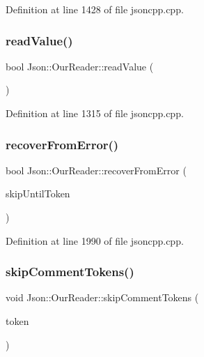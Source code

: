 Definition at line 1428 of file jsoncpp.\+cpp.

\hypertarget{class_json_1_1_our_reader_a1765d9670d191c89a57a22ea5591d35f}{}\label{class_json_1_1_our_reader_a1765d9670d191c89a57a22ea5591d35f} 
\subsubsection{\texorpdfstring{read\+Value()}{readValue()}}
{\footnotesize\ttfamily bool Json\+::\+Our\+Reader\+::read\+Value (\begin{DoxyParamCaption}{ }\end{DoxyParamCaption})\hspace{0.3cm}{\ttfamily [private]}}



Definition at line 1315 of file jsoncpp.\+cpp.

\hypertarget{class_json_1_1_our_reader_a035651f0700a76a815e5f904c63ebb1c}{}\label{class_json_1_1_our_reader_a035651f0700a76a815e5f904c63ebb1c} 
\subsubsection{\texorpdfstring{recover\+From\+Error()}{recoverFromError()}}
{\footnotesize\ttfamily bool Json\+::\+Our\+Reader\+::recover\+From\+Error (\begin{DoxyParamCaption}\item[{\hyperlink{class_json_1_1_our_reader_a15116f7276ddf1e7a2cc3cbefa884dcc}{Token\+Type}}]{skip\+Until\+Token }\end{DoxyParamCaption})\hspace{0.3cm}{\ttfamily [private]}}



Definition at line 1990 of file jsoncpp.\+cpp.

\hypertarget{class_json_1_1_our_reader_a856dea44d92578c276856d7a65a4ebdc}{}\label{class_json_1_1_our_reader_a856dea44d92578c276856d7a65a4ebdc} 
\subsubsection{\texorpdfstring{skip\+Comment\+Tokens()}{skipCommentTokens()}}
{\footnotesize\ttfamily void Json\+::\+Our\+Reader\+::skip\+Comment\+Tokens (\begin{DoxyParamCaption}\item[{\hyperlink{class_json_1_1_our_reader_1_1_token}{Token} \&}]{token }\end{DoxyParamCaption})\hspace{0.3cm}{\ttfamily [private]}}



